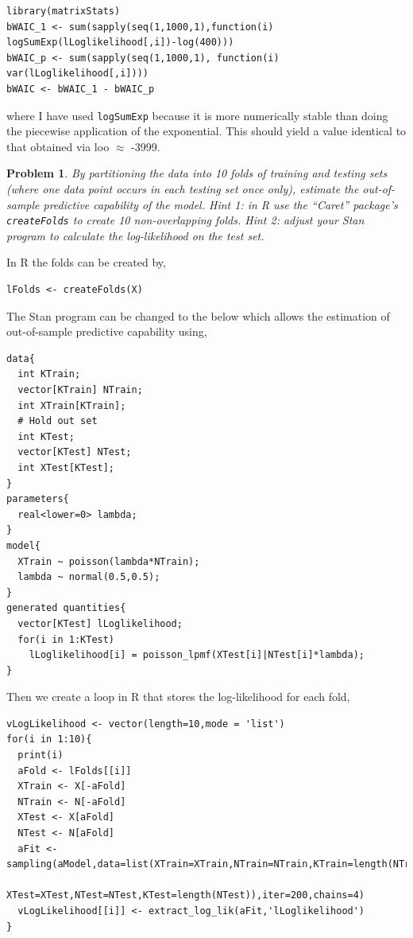 \documentclass{article}
\newtheorem{problem}{Problem}[section]
\begin{document}
\begin{verbatim}
library(matrixStats)
bWAIC_1 <- sum(sapply(seq(1,1000,1),function(i) logSumExp(lLoglikelihood[,i])-log(400)))
bWAIC_p <- sum(sapply(seq(1,1000,1), function(i) var(lLoglikelihood[,i])))
bWAIC <- bWAIC_1 - bWAIC_p
\end{verbatim}

where I have used \texttt{logSumExp} because it is more numerically stable than doing the piecewise application of the exponential. This should yield a value identical to that obtained via loo $\approx$ -3999.

\begin{problem}
	By partitioning the data into 10 folds of training and testing sets (where one data point occurs in each testing set once only), estimate the out-of-sample predictive capability of the model. Hint 1: in R use the ``Caret'' package's \texttt{createFolds} to create 10 non-overlapping folds. Hint 2: adjust your Stan program to calculate the log-likelihood on the test set.
\end{problem}

In R the folds can be created by,

\begin{verbatim}
lFolds <- createFolds(X)
\end{verbatim}

The Stan program can be changed to the below which allows the estimation of out-of-sample predictive capability using,

\begin{verbatim}
data{
  int KTrain;
  vector[KTrain] NTrain;
  int XTrain[KTrain];
  # Hold out set
  int KTest;
  vector[KTest] NTest;
  int XTest[KTest];
}
parameters{
  real<lower=0> lambda;
}
model{
  XTrain ~ poisson(lambda*NTrain);
  lambda ~ normal(0.5,0.5);
}
generated quantities{
  vector[KTest] lLoglikelihood;
  for(i in 1:KTest)
    lLoglikelihood[i] = poisson_lpmf(XTest[i]|NTest[i]*lambda);
}
\end{verbatim}

Then we create a loop in R that stores the log-likelihood for each fold,

\begin{verbatim}
vLogLikelihood <- vector(length=10,mode = 'list')
for(i in 1:10){
  print(i)
  aFold <- lFolds[[i]]
  XTrain <- X[-aFold]
  NTrain <- N[-aFold]
  XTest <- X[aFold]
  NTest <- N[aFold]
  aFit <- sampling(aModel,data=list(XTrain=XTrain,NTrain=NTrain,KTrain=length(NTrain),
                          XTest=XTest,NTest=NTest,KTest=length(NTest)),iter=200,chains=4)
  vLogLikelihood[[i]] <- extract_log_lik(aFit,'lLoglikelihood')
}
\end{verbatim}
\end{document}
